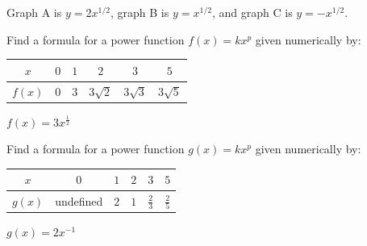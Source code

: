 \begin{solution}
Graph A is $y=2 x^{1/2}$, graph B is $y=x^{1/2}$, and graph C is $y=-x^{1/2}$.
\end{solution}


\begin{exercise}
Find a formula for a power function $f(x)=kx^p$ given numerically by:

\begin{center}
\begin{tabular}{|c|c|c|c|c|c|} \hline
$x$ & $0$ & $1$ & $2$ & $3$ & $5$ \\\hline
$f(x)$ & $0$ & $3$ & $3\sqrt{2}$ & $3\sqrt{3}$ & $3\sqrt{5}$ \\\hline
\end{tabular}
\end{center}
\end{exercise}

\begin{solution}
$f(x)=3x^\frac{1}{2}$
\end{solution}


\begin{exercise}
Find a formula for a power function $g(x)=kx^p$ given numerically by: 

\begin{center}
\begin{tabular}{|c|c|c|c|c|c|} \hline
$x$  & $0$ & $1$ & $2$ & $3$ & $5$ \\\hline
$g(x)$ & undefined & $2$ & $1$ & $\frac{2}{3}$ & $\frac{2}{5}$ \\\hline
\end{tabular}
\end{center}
\end{exercise}

\begin{solution}
$g(x)=2x^{-1}$
\end{solution}


